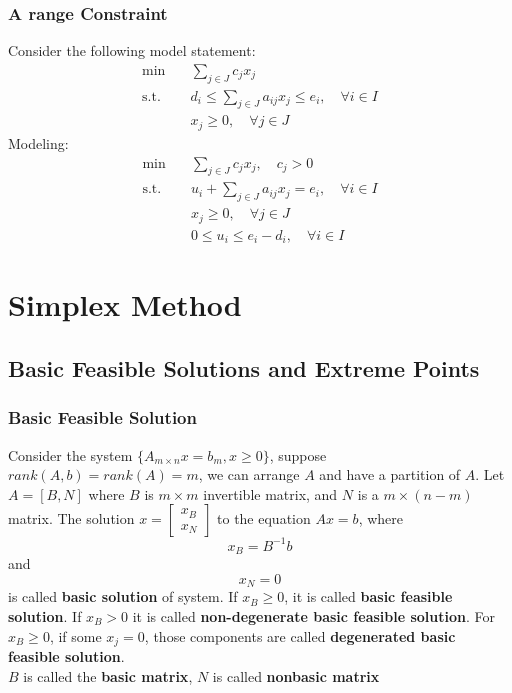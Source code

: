 			\subsection{A range Constraint}
				Consider the following model statement:
				\begin{align}
					\min \quad & \sum_{j\in J}c_jx_j \\
					\text{s.t.} \quad & d_i\le \sum_{j\in J}a_{ij}x_j \le e_i, \quad \forall i\in I \\
					                  & x_j \ge 0, \quad \forall j\in J 
				\end{align}
				Modeling:
				\begin{align}
					\min \quad & \sum_{j\in J}c_jx_j, \quad c_j > 0 \\
					\text{s.t.} \quad & u_i + \sum_{j\in J}a_{ij}x_j = e_i, \quad \forall i\in I \\
					                  & x_j \ge 0, \quad \forall j\in J \\
					                  & 0\le u_i \le e_i-d_i, \quad \forall i\in I 
				\end{align}

	\chapter{Simplex Method}
		\section{Basic Feasible Solutions and Extreme Points}
			\subsection{Basic Feasible Solution}
				Consider the system $\{A_{m\times n}x=b_m, x\ge 0\}$, suppose $rank(A, b) = rank(A) =m$, we can arrange $A$ and have a partition of $A$. Let $A=[B, N]$ where $B$ is $m\times m$ invertible matrix, and $N$ is a $m\times (n-m)$ matrix. The solution $x=\left[\begin{matrix}x_B\\x_N\end{matrix}\right]$ to the equation $Ax=b$, where
				\begin{equation}
					x_B = B^{-1}b 
				\end{equation}
				and
				\begin{equation}
					x_N = 0 
				\end{equation}
				is called \textbf{basic solution} of system. If $x_B \ge 0$, it is called \textbf{basic feasible solution}. If $x_B > 0$ it is called \textbf{non-degenerate basic feasible solution}. For $x_B \ge 0$, if some $x_j = 0$, those components are called \textbf{degenerated basic feasible solution}.\\
				$B$ is called the \textbf{basic matrix}, $N$ is called \textbf{nonbasic matrix}

